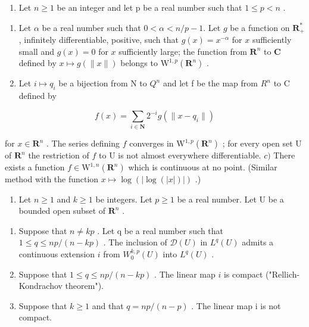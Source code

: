 \begin{enumerate}
\def\labelenumi{\arabic{enumi})}
\setcounter{enumi}{14}
\tightlist
\item
  Let \(n \geqslant 1\) be an integer and let p be a real number such that \(1 \leqslant p < n\) .
\end{enumerate}

\begin{enumerate}
\def\labelenumi{\alph{enumi})}
\item
  Let \(\alpha\) be a real number such that \(0 < \alpha < n/p - 1\). Let \(g\) be a function on \(\mathbf{R}_{+}^{*}\) , infinitely differentiable, positive, such that \(g(x) = x^{-\alpha}\) for \(x\) sufficiently small and \(g(x) = 0\) for \(x\) sufficiently large; the function from \(\mathbf{R}^{n}\) to \(\mathbf{C}\) defined by \(x \mapsto g(\|x\|)\) belongs to \(\mathrm{W}^{1,p}(\mathbf{R}^{n})\) .
\item
  Let \(i \mapsto q_{i}\) be a bijection from N to \(Q^{n}\) and let f be the map from \(R^{n}\) to C defined by
\end{enumerate}

\[
f (x) = \sum_ {i \in \mathbf {N}} 2 ^ {- i} g (\| x - q _ {i} \|)
\]

for \(x \in \mathbf{R}^n\) . The series defining \(f\) converges in \(\mathrm{W}^{1,p}(\mathbf{R}^n)\) ; for every open set U of \(\mathbf{R}^n\) the restriction of \(f\) to U is not almost everywhere differentiable. \(c)\) There exists a function \(f \in \mathrm{W}^{1,n}(\mathbf{R}^n)\) which is continuous at no point. (Similar method with the function \(x \mapsto \log(|\log(|x|)|)\) .)

\begin{enumerate}
\def\labelenumi{\arabic{enumi})}
\setcounter{enumi}{15}
\tightlist
\item
  Let \(n \geqslant 1\) and \(k \geqslant 1\) be integers. Let \(p \geqslant 1\) be a real number. Let U be a bounded open subset of \(\mathbf{R}^n\) .
\end{enumerate}

\begin{enumerate}
\def\labelenumi{\alph{enumi})}
\item
  Suppose that \(n \neq kp\) . Let q be a real number such that \(1 \leqslant q \leqslant np/(n-kp)\) . The inclusion of \(\mathcal{D}(U)\) in \(L^{q}(U)\) admits a continuous extension \(i\) from \(W_{0}^{k,p}(U)\) into \(L^{q}(U)\) .
\item
  Suppose that \(1 \leqslant q \leqslant np/(n-kp)\) . The linear map \(i\) is compact ("Rellich-Kondrachov theorem").
\item
  Suppose that \(k \geqslant 1\) and that \(q = np/(n - p)\) . The linear map i is not compact.
\end{enumerate}

